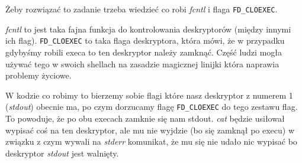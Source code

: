 Żeby rozwiązać to zadanie trzeba wiedzieć co robi \textit{fcntl} i flaga \texttt{FD\_CLOEXEC}.

\textit{fcntl} to jest taka fajna funkcja do kontrolowania deskryptorów (między innymi ich flag). \texttt{FD\_CLOEXEC} to taka flaga deskryptora, która mówi, że w przypadku gdybyśmy robili execa to ten deskryptor należy zamknąć. Część ludzi mogła używać tego w swoich shellach na zasadzie magicznej linijki która naprawia problemy życiowe.

W kodzie co robimy to bierzemy sobie flagi które nasz deskryptor z numerem 1 (\textit{stdout}) obecnie ma, po czym dorzucamy flagę \texttt{FD\_CLOEXEC} do tego zestawu flag. To powoduje, że po obu execach zamknie się nam stdout. \textit{cat} będzie usiłował wypisać coś na ten deskryptor, ale mu nie wyjdzie (bo się zamknął po execu) w związku z czym wywali na \textit{stderr} komunikat, że mu się nie udało nic wypisać bo deskryptor \textit{stdout} jest walnięty.  

